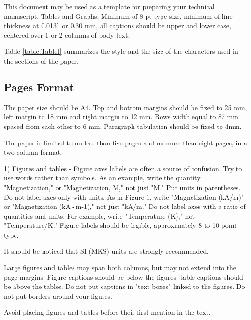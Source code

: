 \documentclass[10pt,twoside,a4paper]{article}
\begin{document}
This document may be used as a template for preparing your technical manuscript. Tables and Graphs: Minimum of 8 pt type size, minimum of line thickness at 0.013” or 0.30 mm, all captions should be upper and lower case, centered over 1 or 2 columns of body text.

Table \ref{table:TableI} summarizes the style and the size of the characters used in the sections of the paper.

\subsection{Pages Format }

The paper size should be A4. Top and bottom margins should be fixed to 25 mm, left margin to 18 mm and right margin to 12 mm. Rows width equal to 87 mm spaced from each other to 6 mm. Paragraph tabulation should be fixed to 4mm.

The paper is limited to no less than five pages and no more than eight pages, in a two column format.

1) Figures and tables - Figure axes labels are often a source of confusion. Try to use words rather than symbols. As an example, write the quantity "Magnetization," or "Magnetization, M," not just "M." Put units in parentheses. Do not label axes only with units. As in Figure 1, write "Magnetization (kA/m)" or "Magnetization (kA•m-1)," not just "kA/m." Do not label axes with a ratio of quantities and units. For example, write "Temperature (K)," not "Temperature/K." Figure labels should be legible, approximately 8 to 10 point type.


It should be noticed that SI (MKS) units are strongly recommended.

Large figures and tables may span both columns, but may not extend into the page margins. Figure captions should be below the figures; table captions should be above the tables. Do not put captions in "text boxes" linked to the figures. Do not put borders around your figures.

Avoid placing figures and tables before their first mention in the text.
\end{document}
